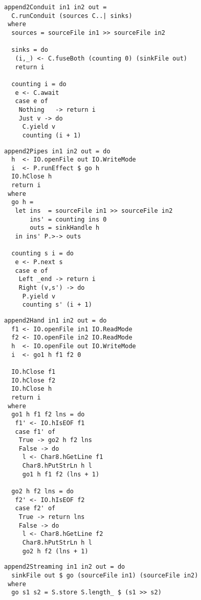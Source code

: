 \begin{lstlisting}[float,label=l:a:bench:append2Conduit,caption=Conduit implementation of \Hs/append2/]
append2Conduit in1 in2 out =
  C.runConduit (sources C..| sinks)
 where
  sources = sourceFile in1 >> sourceFile in2

  sinks = do
   (i,_) <- C.fuseBoth (counting 0) (sinkFile out)
   return i

  counting i = do
   e <- C.await
   case e of
    Nothing   -> return i
    Just v -> do
     C.yield v
     counting (i + 1)
\end{lstlisting}

\begin{lstlisting}[float,label=l:a:bench:append2Pipes,caption=Pipes implementation of \Hs/append2/]
append2Pipes in1 in2 out = do
  h  <- IO.openFile out IO.WriteMode
  i  <- P.runEffect $ go h
  IO.hClose h
  return i
 where
  go h =
   let ins  = sourceFile in1 >> sourceFile in2
       ins' = counting ins 0
       outs = sinkHandle h
   in ins' P.>-> outs 

  counting s i = do
   e <- P.next s
   case e of
    Left _end -> return i
    Right (v,s') -> do
     P.yield v
     counting s' (i + 1)
\end{lstlisting}

\begin{lstlisting}[float,label=l:a:bench:append2Hand,caption=Hand-fused implementation of \Hs/append2/]
append2Hand in1 in2 out = do
  f1 <- IO.openFile in1 IO.ReadMode
  f2 <- IO.openFile in2 IO.ReadMode
  h  <- IO.openFile out IO.WriteMode
  i  <- go1 h f1 f2 0

  IO.hClose f1
  IO.hClose f2
  IO.hClose h
  return i
 where
  go1 h f1 f2 lns = do
   f1' <- IO.hIsEOF f1
   case f1' of
    True -> go2 h f2 lns
    False -> do
     l <- Char8.hGetLine f1
     Char8.hPutStrLn h l
     go1 h f1 f2 (lns + 1)

  go2 h f2 lns = do
   f2' <- IO.hIsEOF f2
   case f2' of
    True -> return lns
    False -> do
     l <- Char8.hGetLine f2
     Char8.hPutStrLn h l
     go2 h f2 (lns + 1)
\end{lstlisting}

\begin{lstlisting}[float,label=l:a:bench:append2Streaming,caption=Streaming implementation of \Hs/append2/]
append2Streaming in1 in2 out = do
  sinkFile out $ go (sourceFile in1) (sourceFile in2)
 where
  go s1 s2 = S.store S.length_ $ (s1 >> s2)
\end{lstlisting}

